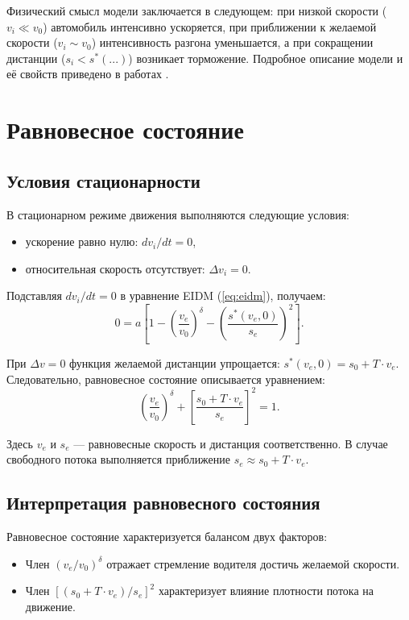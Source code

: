 Физический смысл модели заключается в следующем: при низкой скорости ($v_i \ll v_0$) автомобиль интенсивно ускоряется, при приближении к желаемой скорости ($v_i \sim v_0$) интенсивность разгона уменьшается, а при сокращении дистанции ($s_i < s^*(...)$) возникает торможение. Подробное описание модели и её свойств приведено в работах \cite{treiber2013,helbing2001}.

\section{Равновесное состояние}
\label{sec:equilibrium}

\subsection{Условия стационарности}
\label{subsec:equilibrium_conditions}

В стационарном режиме движения выполняются следующие условия:
\begin{itemize}
    \item ускорение равно нулю: $dv_i/dt=0$,
    \item относительная скорость отсутствует: $\Delta v_i=0$.
\end{itemize}

Подставляя $dv_i/dt=0$ в уравнение EIDM (\ref{eq:eidm}), получаем:
\begin{equation}
\label{eq:equilibrium_eidm}
0 = a \left[1 - \left(\frac{v_e}{v_0}\right)^\delta - \left( \frac{s^*(v_e,0)}{s_e} \right)^2 \right].
\end{equation}

При $\Delta v=0$ функция желаемой дистанции упрощается: $s^*(v_e,0)= s_0+ T\cdot v_e$. Следовательно, равновесное состояние описывается уравнением:
\begin{equation}
\label{eq:equilibrium_final}
\left(\frac{v_e}{v_0}\right)^\delta + \left[ \frac{s_0+ T\cdot v_e}{s_e} \right]^2= 1.
\end{equation}

Здесь $v_e$ и $s_e$ — равновесные скорость и дистанция соответственно. В случае свободного потока выполняется приближение $s_e \approx s_0+ T\cdot v_e$.

\subsection{Интерпретация равновесного состояния}
\label{subsec:equilibrium_interpretation}

Равновесное состояние характеризуется балансом двух факторов:
\begin{itemize}
    \item Член $(v_e/v_0)^\delta$ отражает стремление водителя достичь желаемой скорости.
    \item Член $\left[ (s_0+ T\cdot v_e)/ s_e\right]^2$ характеризует влияние плотности потока на движение.
\end{itemize}

